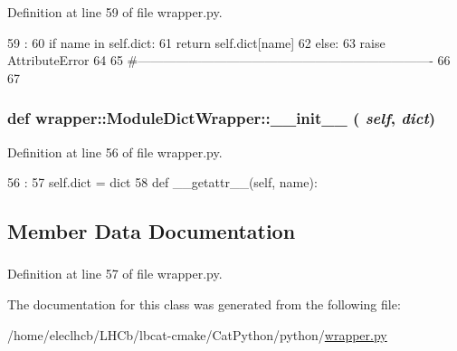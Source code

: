 Definition at line 59 of file wrapper.py.


\begin{DoxyCode}
59                                :
60         if name in self.dict:
61             return self.dict[name]
62         else:
63             raise AttributeError
64 
65 #----------------------------------------------------------------------
66 
67 

\end{DoxyCode}
\hypertarget{classwrapper_1_1ModuleDictWrapper_ab9c57cee66be3af210552d4e94f165c4}{
\subsubsection[{\_\-\_\-init\_\-\_\-}]{\setlength{\rightskip}{0pt plus 5cm}def wrapper::ModuleDictWrapper::\_\-\_\-init\_\-\_\- ( {\em self}, \/   {\em dict})}}
\label{classwrapper_1_1ModuleDictWrapper_ab9c57cee66be3af210552d4e94f165c4}


Definition at line 56 of file wrapper.py.


\begin{DoxyCode}
56                             :
57         self.dict = dict
58 
    def __getattr__(self, name):
\end{DoxyCode}


\subsection{Member Data Documentation}
\hypertarget{classwrapper_1_1ModuleDictWrapper_afc64f92e1307c8668944903e0691313e}{
\subsubsection[{dict}]{}}
\label{classwrapper_1_1ModuleDictWrapper_afc64f92e1307c8668944903e0691313e}


Definition at line 57 of file wrapper.py.

The documentation for this class was generated from the following file:\begin{DoxyCompactItemize}
\item 
/home/eleclhcb/LHCb/lbcat-\/cmake/CatPython/python/\hyperlink{wrapper_8py}{wrapper.py}\end{DoxyCompactItemize}
